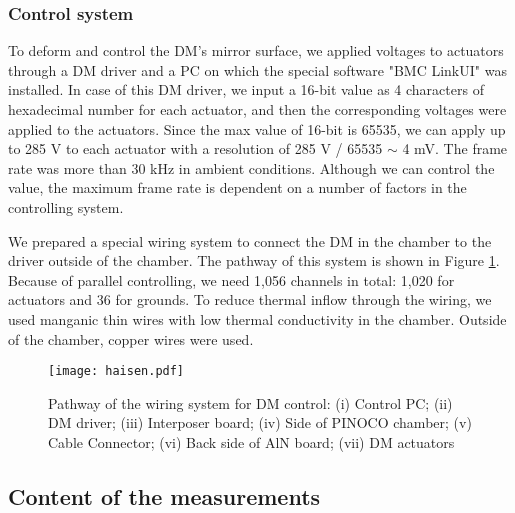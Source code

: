 \documentclass[a4paper]{article}
\begin{document}
\subsubsection{Control system}
\label{control_system}
To deform and control the DM's mirror surface, we applied voltages to actuators through a DM driver and a PC on which the special software "BMC LinkUI" was installed. In case of this DM driver, we input a 16-bit value as 4 characters of hexadecimal number for each actuator, and then the corresponding voltages were applied to the actuators. Since the max value of 16-bit is 65535, we can apply up to 285 V to each actuator with a resolution of 285 V / 65535 $\sim$ 4 mV. The frame rate was more than 30 kHz in ambient conditions. Although we can control the value, the maximum frame rate is dependent on a number of factors in the controlling system.

We prepared a special wiring system to connect the DM in the chamber to the driver outside of the chamber. The pathway of this system is shown in Figure \ref{haisen}. Because of parallel controlling, we need 1,056 channels in total: 1,020 for actuators and 36 for grounds. To reduce thermal inflow through the wiring, we used manganic thin wires with low thermal conductivity in the chamber. Outside of the chamber, copper wires were used.

\begin{figure}[tb]
\centering
\texttt{[image: haisen.pdf]}
\caption{Pathway of the wiring system for DM control: (i) Control PC; (ii) DM driver; (iii) Interposer board; (iv) Side of PINOCO chamber; (v) Cable Connector; (vi) Back side of AlN board; (vii) DM actuators}
\label{haisen}
\end{figure}

\subsection{Content of the measurements}
\end{document}
